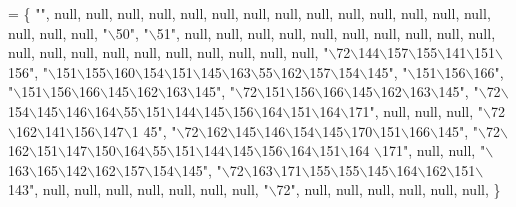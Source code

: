 \begin{DoxyCode}
= \{
        \textcolor{stringliteral}{""}, null, null, null, null, null, null, null, null, null, null, null, null,
        null, null, null, null, null, \textcolor{stringliteral}{"\(\backslash\)50"}, \textcolor{stringliteral}{"\(\backslash\)51"}, null, null, null, null, null, null, null,
        null, null, null, null, null, null, null, null, null, null, null, null, null,
        \textcolor{stringliteral}{"\(\backslash\)72\(\backslash\)144\(\backslash\)157\(\backslash\)155\(\backslash\)141\(\backslash\)151\(\backslash\)156"}, \textcolor{stringliteral}{"\(\backslash\)151\(\backslash\)155\(\backslash\)160\(\backslash\)154\(\backslash\)151\(\backslash\)145\(\backslash\)163\(\backslash\)55\(\backslash\)162\(\backslash\)157\(\backslash\)154\(\backslash\)145"}, \textcolor{stringliteral}{"\(\backslash\)151\(\backslash\)156\(\backslash\)166"},
        \textcolor{stringliteral}{"\(\backslash\)151\(\backslash\)156\(\backslash\)166\(\backslash\)145\(\backslash\)162\(\backslash\)163\(\backslash\)145"}, \textcolor{stringliteral}{"\(\backslash\)72\(\backslash\)151\(\backslash\)156\(\backslash\)166\(\backslash\)145\(\backslash\)162\(\backslash\)163\(\backslash\)145"},
        \textcolor{stringliteral}{"\(\backslash\)72\(\backslash\)154\(\backslash\)145\(\backslash\)146\(\backslash\)164\(\backslash\)55\(\backslash\)151\(\backslash\)144\(\backslash\)145\(\backslash\)156\(\backslash\)164\(\backslash\)151\(\backslash\)164\(\backslash\)171"}, null, null, null, \textcolor{stringliteral}{"\(\backslash\)72\(\backslash\)162\(\backslash\)141\(\backslash\)156\(\backslash\)147\(\backslash\)1
      45"},
        \textcolor{stringliteral}{"\(\backslash\)72\(\backslash\)162\(\backslash\)145\(\backslash\)146\(\backslash\)154\(\backslash\)145\(\backslash\)170\(\backslash\)151\(\backslash\)166\(\backslash\)145"}, \textcolor{stringliteral}{"\(\backslash\)72\(\backslash\)162\(\backslash\)151\(\backslash\)147\(\backslash\)150\(\backslash\)164\(\backslash\)55\(\backslash\)151\(\backslash\)144\(\backslash\)145\(\backslash\)156\(\backslash\)164\(\backslash\)151\(\backslash\)164
      \(\backslash\)171"}, null, null,
        \textcolor{stringliteral}{"\(\backslash\)163\(\backslash\)165\(\backslash\)142\(\backslash\)162\(\backslash\)157\(\backslash\)154\(\backslash\)145"}, \textcolor{stringliteral}{"\(\backslash\)72\(\backslash\)163\(\backslash\)171\(\backslash\)155\(\backslash\)155\(\backslash\)145\(\backslash\)164\(\backslash\)162\(\backslash\)151\(\backslash\)143"}, null, null, null, null, 
      null, null,
        null, \textcolor{stringliteral}{"\(\backslash\)72"}, null, null, null, null, null, null, \}
\end{DoxyCode}
